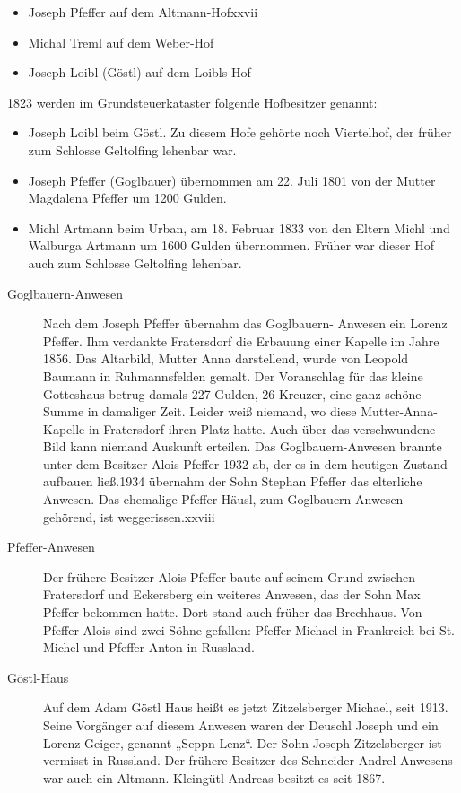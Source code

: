 \documentclass{book}
\begin{document}
\begin{itemize}
\item Joseph Pfeffer auf dem Altmann-Hofxxvii

\item Michal Treml auf dem Weber-Hof

\item Joseph Loibl (Göstl) auf dem Loibls-Hof
\end{itemize}

1823 werden im Grundsteuerkataster folgende Hofbesitzer genannt:

\begin{itemize}
\item Joseph Loibl beim Göstl. Zu diesem Hofe gehörte noch Viertelhof, der
früher zum Schlosse Geltolfing lehenbar war.

\item Joseph Pfeffer (Goglbauer) übernommen am 22. Juli 1801 von der Mutter
Magdalena Pfeffer um 1200 Gulden.

\item Michl Artmann beim Urban, am 18. Februar 1833 von den Eltern Michl und
Walburga Artmann um 1600 Gulden übernommen. Früher war dieser Hof auch zum
Schlosse Geltolfing lehenbar.
\end{itemize}

\begin{description}
\item[Goglbauern-Anwesen] Nach dem Joseph Pfeffer übernahm das Goglbauern-
Anwesen ein Lorenz Pfeffer. Ihm verdankte Fratersdorf die Erbauung einer Kapelle
im Jahre
1856. Das Altarbild, Mutter Anna darstellend, wurde von Leopold Baumann in
Ruhmannsfelden gemalt. Der Voranschlag für das kleine Gotteshaus betrug damals
227 Gulden, 26 Kreuzer, eine ganz schöne Summe in damaliger Zeit. Leider weiß
niemand, wo diese Mutter-Anna-Kapelle in Fratersdorf ihren Platz hatte. Auch
über das verschwundene Bild kann niemand Auskunft erteilen. Das
Goglbauern-Anwesen brannte unter dem Besitzer Alois Pfeffer 1932 ab, der es in
dem heutigen Zustand aufbauen ließ.1934 übernahm der Sohn Stephan Pfeffer das
elterliche Anwesen. Das ehemalige Pfeffer-Häusl, zum Goglbauern-Anwesen
gehörend, ist weggerissen.xxviii

\item[Pfeffer-Anwesen] Der frühere Besitzer Alois Pfeffer baute auf seinem
Grund zwischen Fratersdorf und Eckersberg ein weiteres Anwesen, das der Sohn Max
Pfeffer bekommen hatte. Dort stand auch früher das Brechhaus. Von Pfeffer Alois
sind zwei Söhne gefallen: Pfeffer Michael in Frankreich bei St. Michel und
Pfeffer Anton in Russland.

\item[Göstl-Haus] Auf dem Adam Göstl Haus heißt es jetzt Zitzelsberger Michael,
seit
1913. Seine Vorgänger auf diesem Anwesen waren der Deuschl Joseph und ein Lorenz
Geiger, genannt „Seppn Lenz“. Der Sohn Joseph Zitzelsberger ist vermisst in
Russland. Der frühere Besitzer des Schneider-Andrel-Anwesens war auch ein
Altmann. Kleingütl Andreas besitzt es seit 1867.
\end{description}
\end{document}
